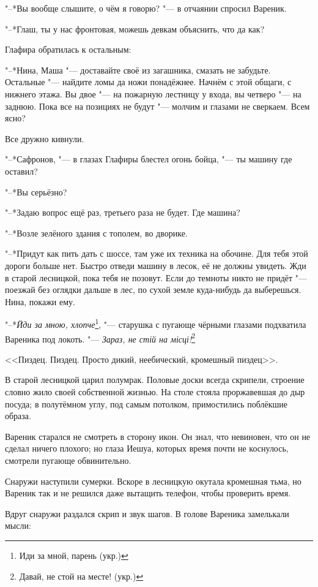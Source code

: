 "--*Вы вообще слышите, о чём я говорю? "--- в отчаянии спросил Вареник.

"--*Глаш, ты у нас фронтовая, можешь девкам объяснить, что да как?

Глафира обратилась к остальным:

"--*Нина, Маша "--- доставайте своё из загашника, смазать не забудьте.
Остальные "--- найдите ломы да ножи понадёжнее.
Начнём с этой общаги, с нижнего этажа.
Вы двое "--- на пожарную лестницу у входа, вы четверо "--- на заднюю.
Пока все на позициях не будут "--- молчим и глазами не сверкаем.
Всем ясно?

Все дружно кивнули.

"--*Сафронов, "--- в глазах Глафиры блестел огонь бойца, "--- ты машину где оставил?

"--*Вы серьёзно?

"--*Задаю вопрос ещё раз, третьего раза не будет.
Где машина?

"--*Возле зелёного здания с тополем, во дворике.

"--*Придут как пить дать с шоссе, там уже их техника на обочине.
Для тебя этой дороги больше нет.
Быстро отведи машину в лесок, её не должны увидеть.
Жди в старой лесницкой, пока тебя не позовут.
Если до темноты никто не придёт "--- поезжай без оглядки дальше в лес, по сухой земле куда-нибудь да выберешься.
Нина, покажи ему.

"--*\textit{Йди за мною, хлопче}\footnote{Иди за мной, парень (укр.)}, "--- старушка с пугающе чёрными глазами подхватила Вареника под локоть.
"--- \textit{Зараз, не стій на місці!}\footnote{Давай, не стой на месте! (укр.)}

\asterism

<<Пиздец.
Пиздец.
Просто дикий, неебический, кромешный пиздец>>.

В старой лесницкой царил полумрак.
Половые доски всегда скрипели, строение словно жило своей собственной жизнью.
На столе стояла проржавевшая до дыр посуда;
в полутёмном углу, под самым потолком, примостились поблёкшие образа.

Вареник старался не смотреть в сторону икон.
Он знал, что невиновен, что он не сделал ничего плохого;
но глаза Иешуа, которых время почти не коснулось, смотрели пугающе обвинительно.

Снаружи наступили сумерки.
Вскоре в лесницкую окутала кромешная тьма, но Вареник так и не решился даже вытащить телефон, чтобы проверить время.

Вдруг снаружи раздался скрип и звук шагов.
В голове Вареника замелькали мысли:

